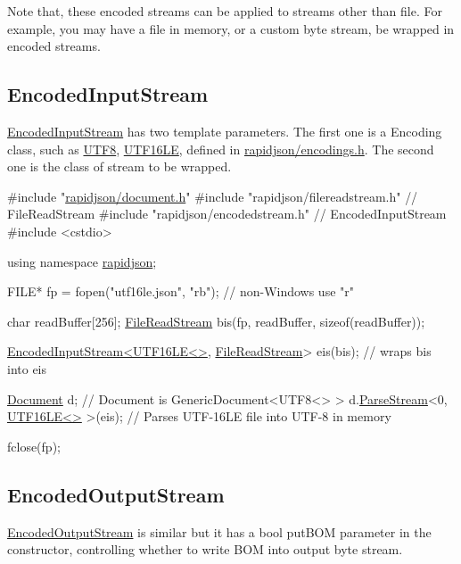 Note that, these encoded streams can be applied to streams other than file. For example, you may have a file in memory, or a custom byte stream, be wrapped in encoded streams.\hypertarget{md_Cadriciel_Commun_Externe_RapidJSON_doc_stream.zh-cn_EncodedInputStream}{}\subsection{Encoded\+Input\+Stream}\label{md_Cadriciel_Commun_Externe_RapidJSON_doc_stream.zh-cn_EncodedInputStream}
{\ttfamily \hyperlink{class_encoded_input_stream}{Encoded\+Input\+Stream}} has two template parameters. The first one is a {\ttfamily Encoding} class, such as {\ttfamily \hyperlink{struct_u_t_f8}{U\+T\+F8}}, {\ttfamily \hyperlink{struct_u_t_f16_l_e}{U\+T\+F16\+LE}}, defined in {\ttfamily \hyperlink{encodings_8h_source}{rapidjson/encodings.\+h}}. The second one is the class of stream to be wrapped.


\begin{DoxyCode}
\textcolor{preprocessor}{#include "\hyperlink{document_8h}{rapidjson/document.h}"}
\textcolor{preprocessor}{#include "rapidjson/filereadstream.h"}   \textcolor{comment}{// FileReadStream}
\textcolor{preprocessor}{#include "rapidjson/encodedstream.h"}    \textcolor{comment}{// EncodedInputStream}
\textcolor{preprocessor}{#include <cstdio>}

\textcolor{keyword}{using namespace }\hyperlink{namespacerapidjson}{rapidjson};

FILE* fp = fopen(\textcolor{stringliteral}{"utf16le.json"}, \textcolor{stringliteral}{"rb"}); \textcolor{comment}{// non-Windows use "r"}

\textcolor{keywordtype}{char} readBuffer[256];
\hyperlink{class_file_read_stream}{FileReadStream} bis(fp, readBuffer, \textcolor{keyword}{sizeof}(readBuffer));

\hyperlink{class_encoded_input_stream}{EncodedInputStream<UTF16LE<>}, \hyperlink{class_file_read_stream}{FileReadStream}> eis(bis);  \textcolor{comment}{// wraps
       bis into eis}

\hyperlink{class_generic_document}{Document} d; \textcolor{comment}{// Document is GenericDocument<UTF8<> > }
d.\hyperlink{class_generic_document_afe94c0abc83a20f2d7dc1ba7677e6238}{ParseStream}<0, \hyperlink{struct_u_t_f16_l_e}{UTF16LE<>} >(eis);  \textcolor{comment}{// Parses UTF-16LE file into UTF-8 in memory}

fclose(fp);
\end{DoxyCode}
\hypertarget{md_Cadriciel_Commun_Externe_RapidJSON_doc_stream.zh-cn_EncodedOutputStream}{}\subsection{Encoded\+Output\+Stream}\label{md_Cadriciel_Commun_Externe_RapidJSON_doc_stream.zh-cn_EncodedOutputStream}
{\ttfamily \hyperlink{class_encoded_output_stream}{Encoded\+Output\+Stream}} is similar but it has a {\ttfamily bool put\+B\+OM} parameter in the constructor, controlling whether to write B\+OM into output byte stream.


